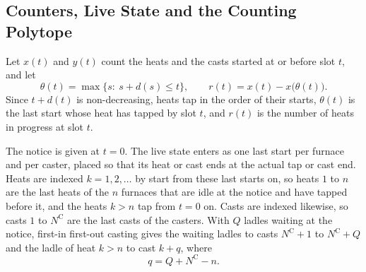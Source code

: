 \documentclass[11pt]{article}
\newcommand{\NC}{N^{\mathrm{C}}}
\begin{document}
\subsection{Counters, Live State and the Counting Polytope}

Let $x(t)$ and $y(t)$ count the heats and the casts started at or before slot $t$, and let
\begin{equation}\label{eq:theta}
\theta(t)=\max\{s:\ s+d(s)\le t\},\qquad r(t)=x(t)-x\big(\theta(t)\big).
\end{equation}
Since $t+d(t)$ is non-decreasing, heats tap in the order of their starts, $\theta(t)$ is the last start whose heat has
tapped by slot $t$, and $r(t)$ is the number of heats in progress at slot $t$.

The notice is given at $t=0$. The live state enters as one last start per furnace and per caster, placed so that its
heat or cast ends at the actual tap or cast end. Heats are indexed $k=1,2,\dots$ by start from these last starts on, so
heats $1$ to $n$ are the last heats of the $n$ furnaces that are idle at the notice and have tapped before it, and the
heats $k>n$ tap from $t=0$ on. Casts are indexed likewise, so casts $1$ to $\NC$ are the last casts of the casters.
With $Q$ ladles waiting at the notice, first-in first-out casting gives the waiting ladles to casts $\NC+1$ to $\NC+Q$
and the ladle of heat $k>n$ to cast $k+q$, where
\begin{equation}\label{eq:q}
q=Q+\NC-n.
\end{equation}
\end{document}
